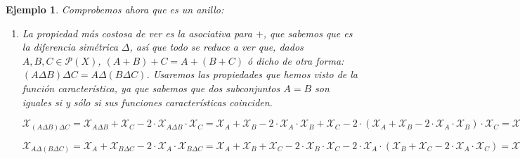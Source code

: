 \documentclass[12pt]{article}
\newtheorem{example}{Ejemplo}[theorem]
\begin{document}
\begin{example}
Comprobemos ahora que es un anillo: 
\begin{enumerate}
\item La propiedad más costosa de ver es la asociativa para $+$, que sabemos que es la diferencia simétrica $\Delta$, así que todo se reduce a ver que, dados $A,B,C \in \mathcal{P}(X)$, $(A+B)+C = A+(B+C)$ ó dicho de otra forma: $(A \Delta B) \Delta C = A \Delta(B \Delta C)$. Usaremos las propiedades que hemos visto de la función característica, ya que sabemos que dos subconjuntos $A = B$ son iguales si y sólo si sus funciones características coinciden. 

$\mathcal{X}_{(A\Delta B) \Delta C} = \mathcal{X}_{A\Delta B} + \mathcal{X}_C - 2 \cdot \mathcal{X}_{A\Delta B} \cdot \mathcal{X}_C = \mathcal{X}_A + \mathcal{X}_B -2 \cdot \mathcal{X}_A \cdot \mathcal{X}_B + \mathcal{X}_C -2 \cdot(\mathcal{X}_A+\mathcal{X}_B-2\cdot\mathcal{X}_A \cdot\mathcal{X}_B) \cdot \mathcal{X}_C = \mathcal{X}_A + \mathcal{X}_B -2 \cdot \mathcal{X}_A \cdot \mathcal{X}_B + \mathcal{X}_C - 2 \cdot \mathcal{X}_A \cdot \mathcal{X}_C - 2\cdot \mathcal{X}_B \cdot \mathcal{X}_C +4 \cdot \mathcal{X}_A \cdot \mathcal{X}_B \cdot \mathcal{X}_C.$ 

$\mathcal{X}_{A\Delta(B\Delta C)} = \mathcal{X}_A + \mathcal{X}_{B \Delta C} - 2 \cdot \mathcal{X}_A \cdot \mathcal{X}_{B \Delta C} = \mathcal{X}_A + \mathcal{X}_B + \mathcal{X}_C - 2 \cdot \mathcal{X}_B \cdot \mathcal{X}_C - 2 \cdot \mathcal{X}_A \cdot (\mathcal{X}_B + \mathcal{X}_C -2 \cdot \mathcal{X}_A \cdot \mathcal{X}_C) = \mathcal{X}_A + \mathcal{X}_B + \mathcal{X}_C - 2 \cdot \mathcal{X}_A \cdot \mathcal{X}_B - 2 \cdot \mathcal{X}_A \cdot \mathcal{X}_C - 2 \cdot \mathcal{X}_B \cdot \mathcal{X}_C + 4 \cdot \mathcal{X}_A \cdot \mathcal{X}_B \cdot \mathcal{X}_C.$


\end{enumerate}
\end{example}
\end{document}
